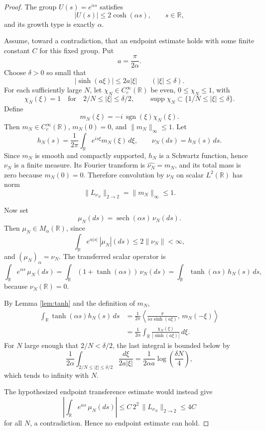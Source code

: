 \documentclass[11pt]{article}
\newcommand{\R}{\mathbb R}
\newcommand{\sech}{\operatorname{sech}}
\newcommand{\sgn}{\operatorname{sgn}}
\newcommand{\supp}{\operatorname{supp}}
\begin{document}
\begin{proof}
The group \(U(s)=e^{\alpha s}\) satisfies
\[
  |U(s)|\le 2\cosh(\alpha s),\qquad s\in\R,
\]
and its growth type is exactly \(\alpha\).

Assume, toward a contradiction, that an endpoint estimate holds with some
finite constant \(C\) for this fixed group. Put
\[
  a=\frac{\pi}{2\alpha}.
\]
Choose \(\delta>0\) so small that
\[
  |\sinh(a\xi)|\le 2a|\xi|
  \qquad (|\xi|\le \delta).
\]
For each sufficiently large \(N\), let \(\chi_N\in C_c^\infty(\R)\) be even,
\(0\le\chi_N\le1\), with
\[
  \chi_N(\xi)=1
  \quad\text{for}\quad
  2/N\le |\xi|\le \delta/2,
  \qquad
  \supp \chi_N\subset\{1/N\le |\xi|\le \delta\}.
\]
Define
\[
  m_N(\xi)=-i\,\sgn(\xi)\chi_N(\xi).
\]
Then \(m_N\in C_c^\infty(\R)\), \(m_N(0)=0\), and
\(\|m_N\|_\infty\le1\). Let
\[
  h_N(s)=\frac1{2\pi}\int_\R e^{is\xi}m_N(\xi)\,d\xi,
  \qquad
  \nu_N(ds)=h_N(s)\,ds .
\]
Since \(m_N\) is smooth and compactly supported, \(h_N\) is a Schwartz
function, hence \(\nu_N\) is a finite measure. Its Fourier transform is
\(\widehat{\nu_N}=m_N\), and its total mass is zero because \(m_N(0)=0\).
Therefore convolution by \(\nu_N\) on scalar \(L^2(\R)\) has norm
\[
  \|L_{\nu_N}\|_{2\to2}=\|m_N\|_\infty\le1.
\]

Now set
\[
  \mu_N(ds)=\sech(\alpha s)\,\nu_N(ds).
\]
Then \(\mu_N\in M_\alpha(\R)\), since
\[
  \int_\R e^{\alpha|s|}\,|\mu_N|(ds)
  \le 2\|\nu_N\|<\infty,
\]
and \((\mu_N)_\alpha=\nu_N\). The transferred scalar operator is
\[
  \int_\R e^{\alpha s}\,\mu_N(ds)
  =
  \int_\R (1+\tanh(\alpha s))\,\nu_N(ds)
  =
  \int_\R \tanh(\alpha s)\,h_N(s)\,ds,
\]
because \(\nu_N(\R)=0\).

By Lemma \ref{lem:tanh} and the definition of \(m_N\),
\[
\begin{aligned}
  \int_\R \tanh(\alpha s)h_N(s)\,ds
  &=
  \frac1{2\pi}
  \left\langle
  \frac{\pi}{i\alpha\sinh(a\xi)},\,m_N(-\xi)
  \right\rangle  \\
  &=
  \frac1{2\alpha}
  \int_\R
  \frac{\chi_N(\xi)}{|\sinh(a\xi)|}\,d\xi .
\end{aligned}
\]
For \(N\) large enough that \(2/N<\delta/2\), the last integral is bounded
below by
\[
  \frac1{2\alpha}
  \int_{2/N\le|\xi|\le\delta/2}
  \frac{d\xi}{2a|\xi|}
  =
  \frac1{2\alpha a}\log\!\left(\frac{\delta N}{4}\right),
\]
which tends to infinity with \(N\).

The hypothesized endpoint transference estimate would instead give
\[
  \left|\int_\R e^{\alpha s}\,\mu_N(ds)\right|
  \le C\,2^2\,\|L_{\nu_N}\|_{2\to2}
  \le 4C
\]
for all \(N\), a contradiction. Hence no endpoint estimate can hold.
\end{proof}
\end{document}
